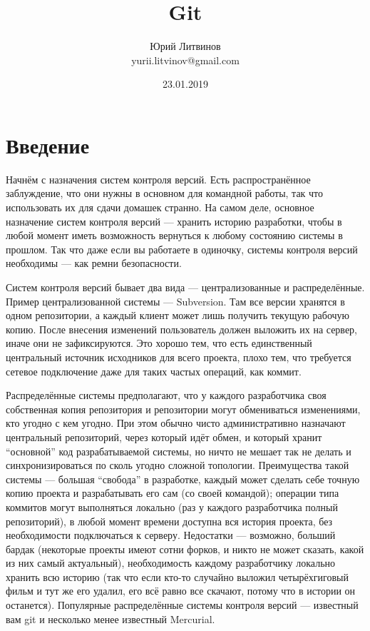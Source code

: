 \documentclass[a5paper]{article}
\title{Git}
\author{Юрий Литвинов\\\small{yurii.litvinov@gmail.com}}
\date{23.01.2019}
\begin{document}
\maketitle
\thispagestyle{empty}

\section{Введение}

Начнём с назначения систем контроля версий. Есть распространённое заблуждение, что они нужны в основном для командной работы, так что использовать их для сдачи домашек странно. На самом деле, основное назначение систем контроля версий --- хранить историю разработки, чтобы в любой момент иметь возможность вернуться к любому состоянию системы в прошлом. Так что даже если вы работаете в одиночку, системы контроля версий необходимы --- как ремни безопасности.

Систем контроля версий бывает два вида --- централизованные и распределённые. Пример централизованной системы --- Subversion. Там все версии хранятся в одном репозитории, а каждый клиент может лишь получить текущую рабочую копию. После внесения изменений пользователь должен выложить их на сервер, иначе они не зафиксируются. Это хорошо тем, что есть единственный центральный источник исходников для всего проекта, плохо тем, что требуется сетевое подключение даже для таких частых операций, как коммит.

Распределённые системы предполагают, что у каждого разработчика своя собственная копия репозитория и репозитории могут обмениваться изменениями, кто угодно с кем угодно. При этом обычно чисто административно назначают центральный репозиторий, через который идёт обмен, и который хранит ``основной'' код разрабатываемой системы, но ничто не мешает так не делать и синхронизироваться по сколь угодно сложной топологии. Преимущества такой системы --- большая ``свобода'' в разработке, каждый может сделать себе точную копию проекта и разрабатывать его сам (со своей командой); операции типа коммитов могут выполняться локально (раз у каждого разработчика полный репозиторий), в любой момент времени доступна вся история проекта, без необходимости подключаться к серверу. Недостатки --- возможно, больший бардак (некоторые проекты имеют сотни форков, и никто не может сказать, какой из них самый актуальный), необходимость каждому разработчику локально хранить всю историю (так что если кто-то случайно выложил четырёхгиговый фильм и тут же его удалил, его всё равно все скачают, потому что в истории он останется). Популярные распределённые системы контроля версий --- известный вам git и несколько менее известный Mercurial.
\end{document}
